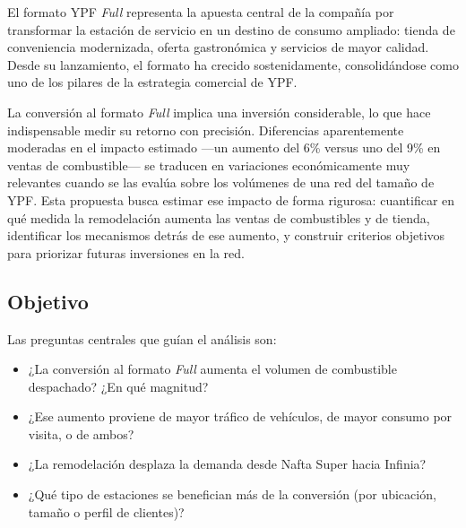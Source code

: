 


\label{block:full}

El formato YPF \emph{Full} representa la apuesta central de la compañía por transformar la estación de servicio en un destino de consumo ampliado: tienda de conveniencia modernizada, oferta gastronómica y servicios de mayor calidad. Desde su lanzamiento, el formato ha crecido sostenidamente, consolidándose como uno de los pilares de la estrategia comercial de YPF.

La conversión al formato \emph{Full} implica una inversión considerable, lo que hace indispensable medir su retorno con precisión. Diferencias aparentemente moderadas en el impacto estimado —un aumento del 6\% versus uno del 9\% en ventas de combustible— se traducen en variaciones económicamente muy relevantes cuando se las evalúa sobre los volúmenes de una red del tamaño de YPF. Esta propuesta busca estimar ese impacto de forma rigurosa: cuantificar en qué medida la remodelación aumenta las ventas de combustibles y de tienda, identificar los mecanismos detrás de ese aumento, y construir criterios objetivos para priorizar futuras inversiones en la red.

\subsection{Objetivo}
Las preguntas centrales que guían el análisis son:
    
\begin{itemize}
    \item ¿La conversión al formato \emph{Full} aumenta el volumen de combustible despachado? ¿En qué magnitud?
    \item ¿Ese aumento proviene de mayor tráfico de vehículos, de mayor consumo por visita, o de ambos?
    \item ¿La remodelación desplaza la demanda desde Nafta Super hacia Infinia?
    \item ¿Qué tipo de estaciones se benefician más de la conversión (por ubicación, tamaño o perfil de clientes)?
\end{itemize}


